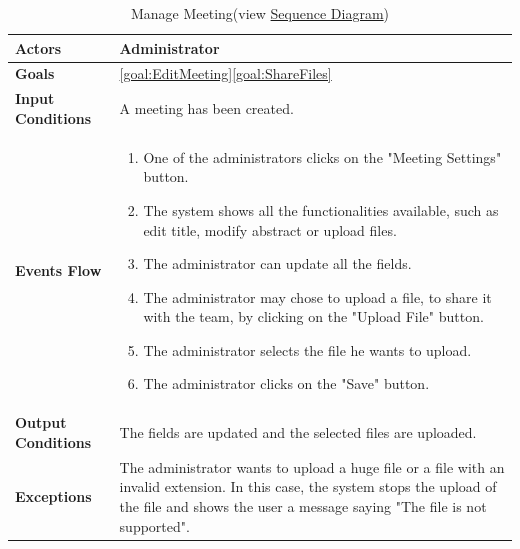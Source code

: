 \begin{table}[H]
\centering
\def\arraystretch{1.5}
\begin{tabular}{|m{7cm}|m{7cm}|}
	\hline
	\textbf{Actors}            & Administrator    \\ \hline
	\textbf{Goals}             & \ref{goal:EditMeeting}\newline \ref{goal:ShareFiles}           \\ \hline
	\textbf{Input Conditions}  & A meeting has been created.           \\ \hline
	\textbf{Events Flow}       &  
	\begin{enumerate}[topsep=0pt, leftmargin=*]
		\item One of the administrators clicks on the "Meeting Settings" button.
		\item The system shows all the functionalities available, such as edit title, modify abstract or upload files.
		\item The administrator can update all the fields.
		\item The administrator may chose to upload a file, to share it with the team, by clicking on the "Upload File" button.
		\item The administrator selects the file he wants to upload.
		\item The administrator clicks on the "Save" button.
	\end{enumerate}             \\ \hline
	\textbf{Output Conditions} & The fields are updated and the selected files are uploaded.          \\ \hline
	\textbf{Exceptions}        & The administrator wants  to upload a huge file or a file with an invalid extension. In this case, the system stops the upload of the file and shows the user a message saying "The file is not supported". \\ \hline
\end{tabular}
\caption[Manage Meeting]{{Manage Meeting}\label{UseCaseDescr:ManageMeeting} (view \hyperref[SeqDiagr:ManageMeeting]{Sequence Diagram})}
\end{table}

